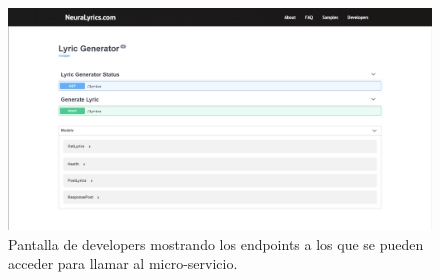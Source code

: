 \documentclass[12pt, a4paper, titlepage]{article}
\begin{document}
		\begin{figure}[H] 
			\includegraphics[width=13.5cm]{./Imagenes/Capturas/pdev.png}
			\centering \caption{Pantalla de developers mostrando los endpoints a los que se pueden acceder para llamar al micro-servicio.}
		\end{figure}
	
	\begin{thebibliography}{20}
	\end{thebibliography}	
\end{document}
